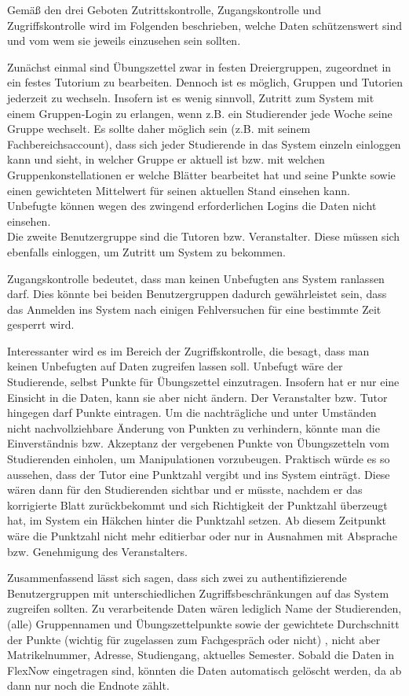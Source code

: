 \documentclass{swp1}
\begin{document}
Gemäß den drei Geboten Zutrittskontrolle, Zugangskontrolle und Zugriffskontrolle wird im Folgenden beschrieben, welche Daten schützenswert sind und vom wem sie jeweils einzusehen sein sollten.

Zunächst einmal sind Übungszettel zwar in festen Dreiergruppen, zugeordnet in ein festes Tutorium zu bearbeiten. Dennoch ist es möglich, Gruppen und Tutorien jederzeit zu wechseln. Insofern ist es wenig sinnvoll, Zutritt zum System mit einem Gruppen-Login zu erlangen, wenn z.B. ein Studierender jede Woche seine Gruppe wechselt. Es sollte daher möglich sein (z.B. mit seinem Fachbereichsaccount), dass sich jeder Studierende in das System einzeln einloggen kann und sieht, in welcher Gruppe er aktuell ist bzw. mit welchen Gruppenkonstellationen er welche Blätter bearbeitet hat und seine Punkte sowie einen gewichteten Mittelwert für seinen aktuellen Stand einsehen kann. Unbefugte können wegen des zwingend erforderlichen Logins die Daten nicht einsehen.\\ 
Die zweite Benutzergruppe sind die Tutoren bzw. Veranstalter. Diese müssen sich ebenfalls einloggen, um Zutritt um System zu bekommen.

Zugangskontrolle bedeutet, dass man keinen Unbefugten ans System ranlassen darf. Dies könnte bei beiden Benutzergruppen dadurch gewährleistet sein, dass das Anmelden ins System nach einigen Fehlversuchen für eine bestimmte Zeit gesperrt wird.

Interessanter wird es im Bereich der Zugriffskontrolle, die besagt, dass man keinen Unbefugten auf Daten zugreifen
lassen soll. Unbefugt wäre der Studierende, selbst Punkte für Übungszettel einzutragen. Insofern hat er nur eine Einsicht in die Daten, kann sie aber nicht ändern. Der Veranstalter bzw. Tutor hingegen darf Punkte eintragen. Um die nachträgliche und unter Umständen nicht nachvollziehbare Änderung von Punkten zu verhindern, könnte man die Einverständnis bzw. Akzeptanz der vergebenen Punkte von Übungszetteln vom Studierenden einholen, um Manipulationen vorzubeugen. Praktisch würde es so aussehen, dass der Tutor eine Punktzahl vergibt und ins System einträgt. Diese wären dann für den Studierenden sichtbar und er müsste, nachdem er das korrigierte Blatt zurückbekommt und sich Richtigkeit der Punktzahl überzeugt hat, im System ein Häkchen hinter die Punktzahl setzen. Ab diesem Zeitpunkt wäre die Punktzahl nicht mehr editierbar oder nur in Ausnahmen mit Absprache bzw. Genehmigung des Veranstalters.

Zusammenfassend lässt sich sagen, dass sich zwei zu authentifizierende Benutzergruppen mit unterschiedlichen Zugriffsbeschränkungen auf das System zugreifen sollten. Zu verarbeitende Daten wären lediglich Name der Studierenden, (alle) Gruppennamen und Übungszettelpunkte sowie der gewichtete Durchschnitt der Punkte (wichtig für zugelassen zum Fachgespräch oder nicht) , nicht aber Matrikelnummer, Adresse, Studiengang, aktuelles Semester. Sobald die Daten in FlexNow eingetragen sind, könnten die Daten automatisch gelöscht werden, da ab dann nur noch die Endnote zählt.
 
\end{document}
